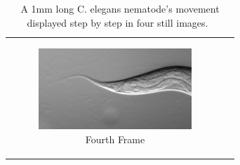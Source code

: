 \documentclass[12pt,oneside,listof=totoc,paper=a4,headings=small]{scrbook}
\begin{document}
{\begin{table}[ht]
\begin{tabular}{cc}
\begin{subfigure}{0.4\textwidth}\centering\includegraphics[width=0.75\columnwidth]{images/Caenorhabditiselegans0A4.png}\caption{Fourth Frame}\label{fig:eleganstabd}\end{subfigure}
\end{tabular}
\caption{A 1mm long C. elegans nematode's movement displayed step by step in four still images.~\cite{crawling}}
\label{tab:elegans}
\end{table}
}

\newpage
\end{document}
